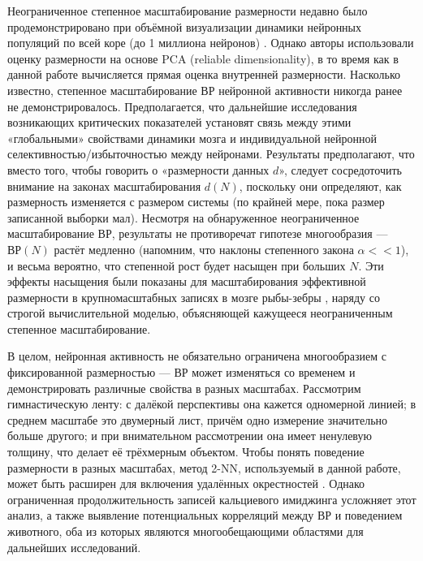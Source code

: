 Неограниченное степенное масштабирование размерности недавно было продемонстрировано при объёмной визуализации динамики нейронных популяций по всей коре (до 1 миллиона нейронов) \cite{Manley2024}. Однако авторы использовали оценку размерности на основе PCA (reliable dimensionality), в то время как в данной работе вычисляется прямая оценка внутренней размерности. Насколько известно, степенное масштабирование ВР нейронной активности никогда ранее не демонстрировалось. Предполагается, что дальнейшие исследования возникающих критических показателей установят связь между этими «глобальными» свойствами динамики мозга и индивидуальной нейронной селективностью/избыточностью между нейронами. Результаты предполагают, что вместо того, чтобы говорить о «размерности данных $d$», следует сосредоточить внимание на законах масштабирования $d(N)$, поскольку они определяют, как размерность изменяется с размером системы (по крайней мере, пока размер записанной выборки мал). Несмотря на обнаруженное неограниченное масштабирование ВР, результаты не противоречат гипотезе многообразия — $ВР(N)$ растёт медленно (напомним, что наклоны степенного закона $\alpha << 1$), и весьма вероятно, что степенной рост будет насыщен при больших $N$. Эти эффекты насыщения были показаны для масштабирования эффективной размерности в крупномасштабных записях в мозге рыбы-зебры \cite{Wang2025}, наряду со строгой вычислительной моделью, объясняющей кажущееся неограниченным степенное масштабирование.

В целом, нейронная активность не обязательно ограничена многообразием с фиксированной размерностью — ВР может изменяться со временем и демонстрировать различные свойства в разных масштабах. Рассмотрим гимнастическую ленту: с далёкой перспективы она кажется одномерной линией; в среднем масштабе это двумерный лист, причём одно измерение значительно больше другого; и при внимательном рассмотрении она имеет ненулевую толщину, что делает её трёхмерным объектом. Чтобы понять поведение размерности в разных масштабах, метод 2-NN, используемый в данной работе, может быть расширен для включения удалённых окрестностей \cite{gride}. Однако ограниченная продолжительность записей кальциевого имиджинга усложняет этот анализ, а также выявление потенциальных корреляций между ВР и поведением животного, оба из которых являются многообещающими областями для дальнейших исследований.








